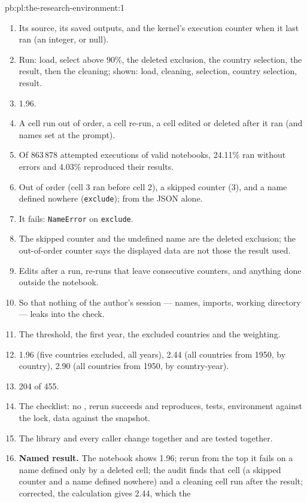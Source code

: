 \begin{solution}{pb:pl:the-research-environment:1}
\begin{enumerate}
\item Its source, its saved outputs, and the kernel's execution counter when it last ran (an integer, or null).
\item Run: load, select above 90\%, the deleted exclusion, the country selection, the result, then the cleaning; shown: load, cleaning,
selection, country selection, result.
\item 1.96.
\item A cell run out of order, a cell re-run, a cell edited or deleted after it ran (and names set at the prompt).
\item Of 863\,878 attempted executions of valid notebooks, 24.11\% ran without errors and 4.03\% reproduced their results.
\item Out of order (cell 3 ran before cell 2), a skipped counter (3), and a name defined nowhere (\texttt{exclude}); from the JSON alone.
\item It fails: \texttt{NameError} on \texttt{exclude}.
\item The skipped counter and the undefined name are the deleted exclusion; the out-of-order counter says the displayed data are not those the
result used.
\item Edits after a run, re-runs that leave consecutive counters, and anything done outside the notebook.
\item So that nothing of the author's session --- names, imports, working directory --- leaks into the check.
\item The threshold, the first year, the excluded countries and the weighting.
\item 1.96 (five countries excluded, all years), 2.44 (all countries from 1950, by country), 2.90 (all countries from 1950, by country-year).
\item 204 of 455.
\item The checklist: no , rerun succeeds and reproduces, tests, environment against the lock, data against the snapshot.
\item The library and every caller change together and are tested together.
\item \textbf{Named result.} The notebook shows 1.96; rerun from the top it fails on a name defined only by a deleted cell; the audit finds that
cell (a skipped counter and a name defined nowhere) and a cleaning cell run after the result; corrected, the calculation gives 2.44, which the

\end{enumerate}
\end{solution}
